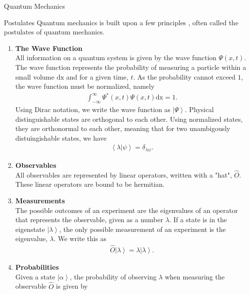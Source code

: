 \documentclass[twoside,english]{uiofysmaster}
\begin{document}
\begin{chapter}{Quantum Mechanics}
 	
	\begin{section}{Postulates}
 		Quantum mechanics is built upon a few principles \cite{Audun,Griffiths,Sakurai,Susskind2014}, often called the postulates of quantum mechanics. 
 		\begin{enumerate}
 			\item \textbf{The Wave Function} \\ All
                          information on a quantum system is given by
                          the wave function $\Psi(x,t) $. The wave
                          function represents the probability of
                          measuring a particle within a small volume
                          $\text{dx}$ and for a given time, $t$. As
                          the probability cannot exceed $1$, the wave
                          function must be normalized, namely
 			\begin{align}
 				\int_{-\infty}^\infty \Psi^*(x,t) \Psi(x,t) \text{dx} = 1.
 			\end{align}
 			Using Dirac notation, we write the wave function as $\left| \Psi \right>$.
 			Physical distinguishable states are orthogonal to each other. Using normalized states, they are orthonormal to each other, meaning that for two unambigously distuingishable states, we have
 			\begin{align}
 				\left< \lambda | \psi \right> = \delta_{\lambda \psi}.
 			\end{align}
 			\item \textbf{Observables}\\
			All observables are represented by linear operators, written with a "hat", $\hat O$. These linear operators are bound to be hermitian. 
			\item \textbf{Measurements}\\
			The possible outcomes of an experiment are the eigenvalues of an operator that represents the observable, given as a number $\lambda$. If a state is in the eigenstate $\left| \lambda \right>$, the only possible measurement of an experiment is the eigenvalue, $\lambda$. We write this as
 			\begin{align}
 				\hat O \left| \lambda \right> = \lambda \left| \lambda \right>.
 			\end{align}
 			\item \textbf{Probabilities}\\
 			Given a state $\left| \alpha \right>$, the probability of observing $\lambda$ when measuring the observable $\hat O$ is given by 

\end{enumerate}
\end{section}
\end{chapter}
\end{document}

